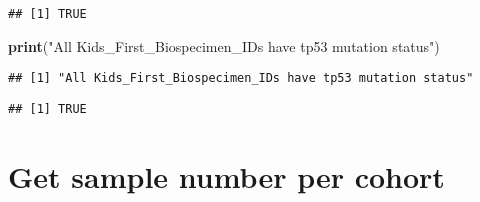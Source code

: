 \documentclass[]{article}
\newenvironment{Shaded}{\begin{snugshade}}{\end{snugshade}}
\newcommand{\KeywordTok}[1]{\textcolor[rgb]{0.13,0.29,0.53}{\textbf{#1}}}
\newcommand{\StringTok}[1]{\textcolor[rgb]{0.31,0.60,0.02}{#1}}
\newcommand{\OperatorTok}[1]{\textcolor[rgb]{0.81,0.36,0.00}{\textbf{#1}}}
\newcommand{\NormalTok}[1]{#1}
\begin{document}
\begin{verbatim}
## [1] TRUE
\end{verbatim}

\begin{Shaded}
\begin{Highlighting}[]
\KeywordTok{print}\NormalTok{(}\StringTok{"All Kids_First_Biospecimen_IDs have tp53 mutation status"}\NormalTok{)}
\end{Highlighting}
\end{Shaded}

\begin{verbatim}
## [1] "All Kids_First_Biospecimen_IDs have tp53 mutation status"
\end{verbatim}

\begin{Shaded}
\end{Shaded}

\begin{verbatim}
## [1] TRUE
\end{verbatim}

\section{Get sample number per
cohort}\label{get-sample-number-per-cohort}
\end{document}
